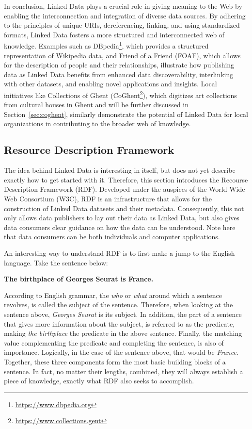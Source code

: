 In conclusion, Linked Data plays a crucial role in giving meaning to the Web by enabling the interconnection and integration of diverse data sources. By adhering to the principles of unique URIs, dereferencing, linking, and using standardized formats, Linked Data fosters a more structured and interconnected web of knowledge. Examples such as DBpedia\footnote{\href{https://www.dbpedia.org}{https://www.dbpedia.org}}, which provides a structured representation of Wikipedia data, and Friend of a Friend (FOAF), which allows for the description of people and their relationships, illustrate how publishing data as Linked Data benefits from enhanced data discoverability, interlinking with other datasets, and enabling novel applications and insights. Local initiatives like Collections of Ghent (CoGhent\footnote{\href{https://www.collections.gent}{https://www.collections.gent}}), which digitizes art collections from cultural houses in Ghent and will be further discussed in Section~\ref{sec:coghent}, similarly demonstrate the potential of Linked Data for local organizations in contributing to the broader web of knowledge. \citep{auer2007dbpedia} \citep{golbeck2008linking} \citep{van2022publishing}

\subsection{Resource Description Framework}
\label{subsec:rdf}

The idea behind Linked Data is interesting in itself, but does not yet describe exactly how to get started with it. Therefore, this section introduces the Recourse Description Framework (RDF). Developed under the auspices of the World Wide Web Consortium (W3C), RDF is an infrastructure that allows for the construction of Linked Data datasets and their metadata. Consequently, this not only allows data publishers to lay out their data as Linked Data, but also gives data consumers clear guidance on how the data can be understood. Note here that data consumers can be both individuals and computer applications. \citep{miller1998introduction}

An interesting way to understand RDF is to first make a jump to the English language. Take the sentence below:
\begin{center}
    \textbf{The birthplace of Georges Seurat is France.}
\end{center}
According to English grammar, the \textit{who} or \textit{what} around which a sentence revolves, is called the subject of the sentence. Therefore, when looking at the sentence above, \textit{Georges Seurat} is its subject. In addition, the part of a sentence that gives more information about the subject, is referred to as the predicate, making \textit{the birthplace} the predicate in the above sentence. Finally, the matching value complementing the predicate and completing the sentence, is also of importance. Logically, in the case of the sentence above, that would be \textit{France}. Together, these three components form the most basic building blocks of a sentence. In fact, no matter their lengths, combined, they will always establish a piece of knowledge, exactly what RDF also seeks to accomplish. \citep{powers2003practical}


